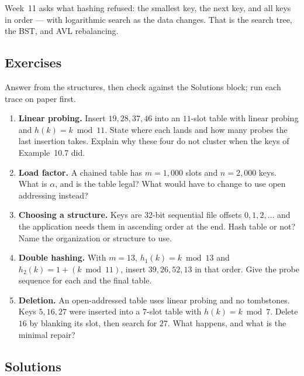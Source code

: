 \documentclass[11pt]{article}
\begin{document}
Week~11 asks what hashing refused: the smallest key, the next key, and all keys in order --- with logarithmic search as the data changes. That is the search tree, the BST, and AVL rebalancing.

\subsection*{Exercises}

Answer from the structures, then check against the Solutions block; run each trace on paper first.

\begin{enumerate}
  \item \textbf{Linear probing.} Insert $19, 28, 37, 46$ into an $11$-slot table with linear probing and $h(k) = k \bmod 11$. State where each lands and how many probes the last insertion takes. Explain why these four do not cluster when the keys of Example~10.7 did.
  \item \textbf{Load factor.} A chained table has $m = 1{,}000$ slots and $n = 2{,}000$ keys. What is $\alpha$, and is the table legal? What would have to change to use open addressing instead?
  \item \textbf{Choosing a structure.} Keys are 32-bit sequential file offsets $0, 1, 2, \dots$ and the application needs them in ascending order at the end. Hash table or not? Name the organization or structure to use.
  \item \textbf{Double hashing.} With $m = 13$, $h_1(k) = k \bmod 13$ and $h_2(k) = 1 + (k \bmod 11)$, insert $39, 26, 52, 13$ in that order. Give the probe sequence for each and the final table.
  \item \textbf{Deletion.} An open-addressed table uses linear probing and no tombstones. Keys $5, 16, 27$ were inserted into a $7$-slot table with $h(k) = k \bmod 7$. Delete $16$ by blanking its slot, then search for $27$. What happens, and what is the minimal repair?
\end{enumerate}

\subsection*{Solutions}
\end{document}
